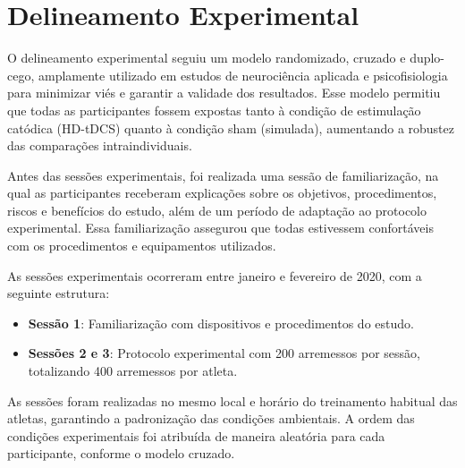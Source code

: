 \section{Delineamento Experimental}

O delineamento experimental seguiu um modelo randomizado, cruzado e duplo-cego, amplamente utilizado em estudos de neurociência aplicada e psicofisiologia para minimizar viés e garantir a validade dos resultados. Esse modelo permitiu que todas as participantes fossem expostas tanto à condição de estimulação catódica (HD-tDCS) quanto à condição sham (simulada), aumentando a robustez das comparações intraindividuais.

Antes das sessões experimentais, foi realizada uma sessão de familiarização, na qual as participantes receberam explicações sobre os objetivos, procedimentos, riscos e benefícios do estudo, além de um período de adaptação ao protocolo experimental. Essa familiarização assegurou que todas estivessem confortáveis com os procedimentos e equipamentos utilizados.

As sessões experimentais ocorreram entre janeiro e fevereiro de 2020, com a seguinte estrutura:
\begin{itemize}
    \item \textbf{Sessão 1}: Familiarização com dispositivos e procedimentos do estudo.
    \item \textbf{Sessões 2 e 3}: Protocolo experimental com 200 arremessos por sessão, totalizando 400 arremessos por atleta.
\end{itemize}

As sessões foram realizadas no mesmo local e horário do treinamento habitual das atletas, garantindo a padronização das condições ambientais. A ordem das condições experimentais foi atribuída de maneira aleatória para cada participante, conforme o modelo cruzado.

